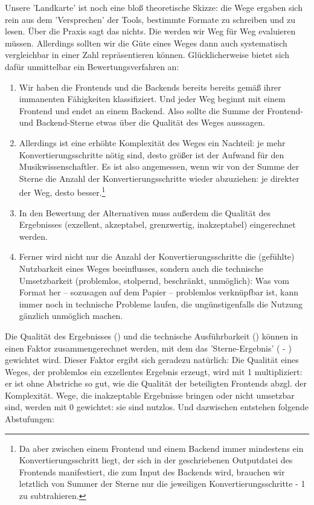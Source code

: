 Unsere 'Landkarte' ist noch eine bloß theoretische Skizze: die Wege ergaben sich
rein aus dem 'Versprechen' der Tools, bestimmte Formate zu schreiben und zu
lesen. Über die Praxis sagt das nichts. Die werden wir Weg für Weg evaluieren
müssen. Allerdings sollten wir die Güte eines Weges dann auch systematisch
vergleichbar in einer Zahl repräsentieren können. Glücklicherweise bietet sich
dafür unmittelbar ein Bewertungsverfahren an:

\begin{enumerate}
  \item Wir haben die Frontends und die Backends bereits bereits gemäß ihrer
  immanenten Fähigkeiten klassifiziert. Und jeder Weg beginnt mit einem Frontend
  und endet an einem Backend. Also sollte die Summe der Frontend- und
  Backend-Sterne etwas über die Qualität des Weges ausssagen.
  \item Allerdings ist eine erhöhte Komplexität des Weges ein Nachteil: je mehr
  Konvertierungsschritte nötig sind, desto größer ist der Aufwand für den
  Musikwissenschaftler. Es ist also angemessen, wenn wir von der Summe der
  Sterne die Anzahl der Konvertierungsschritte wieder abzuziehen: je direkter
  der Weg, desto besser.\footnote{Da aber zwischen einem Frontend und einem
  Backend immer mindestens ein Konvertierungsschritt liegt, der sich in der
  geschriebenen Outputdatei des Frontends manifestiert, die zum Input des
  Backends wird, brauchen wir letztlich von Summer der Sterne nur die jeweiligen
  Konvertierungsschritte - 1 zu subtrahieren.}
  \item In den Bewertung der Alternativen muss außerdem die Qualität des
  Ergebnisses (exzellent, akzeptabel, grenzwertig, inakzeptabel) eingerechnet
  werden.
  \item Ferner wird nicht nur die Anzahl der Konvertierungsschritte die
  (gefühlte) Nutzbarkeit eines Weges beeinflusses, sondern auch die technische
  Umsetzbarkeit (problemlos, stolpernd, beschränkt, unmöglich): Was vom Format
  her -- sozusagen auf dem Papier -- problemlos verknüpfbar ist, kann
  immer noch in technische Probleme laufen, die ungünstigenfalls die Nutzung
  gänzlich unmöglich machen.
\end{enumerate}
 
Die Qualität des Ergebnisses () und die technische Ausführbarkeit ()
können in einen Faktor zusammengerechnet werden, mit dem das 'Sterne-Ergebnis'
( - ) gewichtet wird. Dieser Faktor ergibt sich geradezu natürlich:
Die Qualität eines Weges, der problemlos ein exzellentes Ergebnis erzeugt, wird
mit 1 multipliziert: er ist ohne Abstriche so gut, wie die Qualität der
beteiligten Frontends abzgl. der Komplexität. Wege, die inakzeptable Ergebnisse
bringen oder nicht umsetzbar sind, werden mit 0 gewichtet: sie sind nutzlos.
Und dazwischen entstehen folgende Abstufungen:


